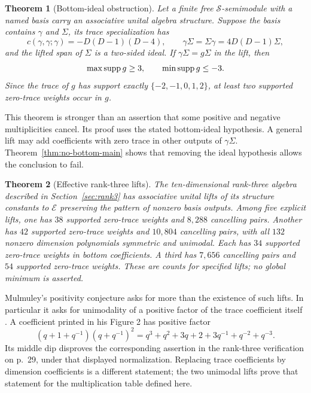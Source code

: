\documentclass[11pt]{article}
\newtheorem{theorem}{Theorem}[section]\newtheorem{proposition}[theorem]{Proposition}
\theoremstyle{definition}\newtheorem{definition}[theorem]{Definition}
\begin{document}
\begin{theorem}[Bottom-ideal obstruction]\label{thm:bottom-main}
Let a finite free $\mathcal S$-semimodule with a named basis carry an associative unital algebra structure. Suppose the basis contains $\gamma$ and $\Sigma$, its trace specialization has
\[
 c(\gamma,\gamma;\gamma)=-D(D-1)(D-4),\qquad
 \gamma\Sigma=\Sigma\gamma=4D(D-1)\Sigma,
\]
and the lifted span of $\Sigma$ is a two-sided ideal. If $\gamma\Sigma=g\Sigma$ in the lift, then
\[
 \max\operatorname{supp} g\ge3,\qquad \min\operatorname{supp} g\le-3.
\]
Since the trace of $g$ has support exactly $\{-2,-1,0,1,2\}$, at least two supported zero-trace weights occur in $g$.
\end{theorem}

This theorem is stronger than an assertion that some positive and negative multiplicities cancel. Its proof uses the stated bottom-ideal hypothesis. A general lift may add coefficients with zero trace in other outputs of $\gamma\Sigma$. Theorem~\ref{thm:no-bottom-main} shows that removing the ideal hypothesis allows the conclusion to fail.

\begin{theorem}[Effective rank-three lifts]\label{thm:lifts-main}
The ten-dimensional rank-three algebra described in Section~\ref{sec:rank3} has associative unital lifts of its structure constants to $\mathcal E$ preserving the pattern of nonzero basis outputs. Among five explicit lifts, one has $38$ supported zero-trace weights and $8{,}288$ cancelling pairs. Another has $42$ supported zero-trace weights and $10{,}804$ cancelling pairs, with all $132$ nonzero dimension polynomials symmetric and unimodal. Each has $34$ supported zero-trace weights in bottom coefficients. A third has $7{,}656$ cancelling pairs and $54$ supported zero-trace weights. These are counts for specified lifts; no global minimum is asserted.
\end{theorem}

Mulmuley's positivity conjecture asks for more than the existence of such lifts. In particular it asks for unimodality of a positive factor of the trace coefficient itself \citep[Conjecture 3.4, p.\ 24]{Mulmuley}. A coefficient printed in his Figure 2 has positive factor
\[
 (q+1+q^{-1})(q+q^{-1})^2
 =q^3+q^2+3q+2+3q^{-1}+q^{-2}+q^{-3}.
\]
Its middle dip disproves the corresponding assertion in the rank-three verification on p.\ 29, under that displayed normalization. Replacing trace coefficients by dimension coefficients is a different statement; the two unimodal lifts prove that statement for the multiplication table defined here.
\end{document}
